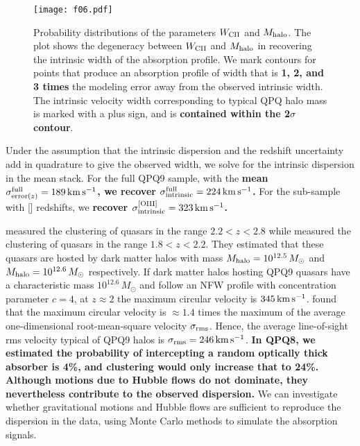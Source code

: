 \documentclass[iop]{emulateapj}
\begin{document}
{\begin{figure}
\texttt{[image: f06.pdf]}
\caption{
Probability distributions of the parameters $W_{\rm CII}$ and $M_{\rm halo}$. The plot shows the 
degeneracy between $W_{\rm CII}$ and $M_{\rm halo}$ in recovering the intrinsic width of the 
absorption profile. We mark contours for points that produce an absorption 
profile of width that is {\bf 1, 2, and 3 times} the modeling error away from the observed intrinsic
width. The intrinsic velocity width corresponding to typical QPQ halo mass is marked with a plus 
sign, and is {\bf contained within the 2$\sigma$ contour}.}
\label{fig:contour}
\end{figure}

Under the assumption that the intrinsic dispersion and the redshift uncertainty add in 
quadrature to give the observed width, we solve for the intrinsic dispersion in the  
mean stack. For the full QPQ9 sample, with the {\bf mean
$\sigma_{{\rm error}(z)}^{\rm full}=189\,{\rm km\,s^{-1}}$, we recover
$\sigma_{\rm intrinsic}^{\rm full}=224\,{\rm km\,s^{-1}}$.} For the sub-sample with []
redshifts, we {\bf recover $\sigma_{\rm intrinsic}^{\rm [OIII]}=323\,{\rm km\,s^{-1}}$.}

\cite{Eftekharzadeh+15} measured the clustering of quasars in the range $2.2<z<2.8$ while 
\cite{RodriguezTorres+17} measured the clustering of quasars in the range $1.8<z<2.2$. They 
estimated that these quasars are hosted by dark matter halos with mass 
$M_{\rm halo}=10^{12.5}\,M_\odot$ and $M_{\rm halo}=10^{12.6}\,M_\odot$ respectively. If dark
matter halos hosting QPQ9 quasars have a characteristic mass $10^{12.6}\,M_\odot$ and follow an 
NFW profile \citep{NavarroFrenkWhite97} with concentration parameter $c=4$, at $z\approx2$ the
maximum circular velocity is $345\,{\rm km\,s^{-1}}$. \cite{TormenBouchetWhite97} found that the
maximum circular velocity is $\approx1.4$ times the maximum of the average one-dimensional
root-mean-square velocity $\sigma_{\rm rms}$. Hence, the average line-of-sight rms velocity
typical of QPQ9 halos is $\sigma_{\rm rms}=246\,{\rm km\,s^{-1}}$. {\bf In QPQ8, we estimated the
probability of intercepting a random optically thick absorber is 4\%, and clustering would only
increase that to 24\%. Although motions due to Hubble flows do not dominate, they nevertheless
contribute to the observed dispersion.} We can investigate
whether gravitational motions and Hubble flows are sufficient to reproduce the dispersion in the
data, using Monte Carlo methods to simulate the absorption signals.

}
\end{document}
